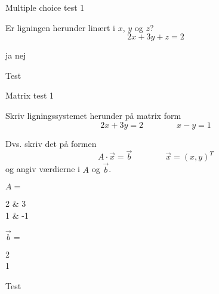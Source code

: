 \documentclass{article}
\begin{document}
\tableofcontents
\newpage

\begin{exercise}{Multiple choice test 1}

Er ligningen herunder linært i $x$, $y$ og $z$?
\[
2x + 3y + z = 2
\]

\begin{multichoice}
\itemtrue ja
\itemfalse nej
\end{multichoice}

\hint
Test

\end{exercise}


\begin{exercise}{Matrix test 1}

Skriv ligningssystemet herunder på matrix form
\[
2x + 3y = 2 \qquad \qquad
x - y = 1
\]

Dvs. skriv det på formen
\[
A \cdot \vec{x} = \vec{b} \qquad \qquad \vec{x} = (x, y)^T
\]
og angiv værdierne i \(A\) og \(\vec{b}\).

\( A = \)
\begin{answermatrix}
2 & 3 \\
1 & -1
\end{answermatrix}


\( \vec{b} = \)
\begin{answermatrix}
2 \\
1
\end{answermatrix}

\hint
Test
\end{exercise}
\end{document}
